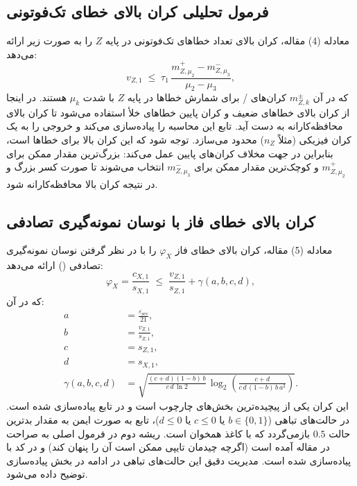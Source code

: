 \subsection{فرمول تحلیلی کران بالای خطای تک‌فوتونی}

معادله (4) مقاله، کران بالای تعداد خطاهای تک‌فوتونی در پایه $Z$ را به صورت زیر ارائه می‌دهد:
\begin{equation}
	v_{Z,1} \;\le\; \tau_1\,\frac{m_{Z,\mu_2}^{+} - m_{Z,\mu_3}^{-}}{\mu_2 - \mu_3},
\end{equation}
که در آن $m_{Z,k}^{\pm}$ کران‌های / برای شمارش خطاها در پایه $Z$ با شدت $\mu_k$ هستند. در اینجا از کران بالای خطاهای  ضعیف و کران پایین خطاهای خلأ استفاده می‌شود تا کران بالای محافظه‌کارانه به دست آید. تابع  این محاسبه را پیاده‌سازی می‌کند و خروجی را به یک کران فیزیکی (مثلاً $n_Z$) محدود می‌سازد. توجه شود که این کران بالا برای خطاها است، بنابراین در جهت مخلاف کران‌های پایین عمل می‌کند: بزرگ‌ترین مقدار ممکن برای $m_{Z,\mu_2}^{+}$ و کوچک‌ترین مقدار ممکن برای $m_{Z,\mu_3}^{-}$ انتخاب می‌شوند تا صورت کسر بزرگ و در نتیجه کران بالا محافظه‌کارانه شود.

\subsection{کران بالای خطای فاز با نوسان نمونه‌گیری تصادفی}

معادله (5) مقاله، کران بالای خطای فاز $\varphi_X$ را با در نظر گرفتن نوسان نمونه‌گیری تصادفی () ارائه می‌دهد:
\begin{equation}
	\varphi_X = \frac{c_{X,1}}{s_{X,1}} \;\le\; \frac{v_{Z,1}}{s_{Z,1}} + \gamma(a, b, c, d),
\end{equation}
که در آن:
\begin{align}
	a &= \frac{\varepsilon_{\text{sec}}}{21}, \\
	b &= \frac{v_{Z,1}}{s_{Z,1}}, \\
	c &= s_{Z,1}, \\
	d &= s_{X,1}, \\
	\gamma(a, b, c, d) &= \sqrt{\frac{(c+d)(1-b)\,b}{c\,d\,\ln 2}\,\log_2\!\left(\frac{c+d}{c\,d\,(1-b)\,b\,a^2}\right)}.
\end{align}
این کران یکی از پیچیده‌ترین بخش‌های چارچوب  است و در تابع  پیاده‌سازی شده است. در حالت‌های تباهی ($b \in \{0, 1\}$ یا $c \le 0$ یا $d \le 0$)، تابع به صورت ایمن به مقدار بدترین حالت $0.5$ بازمی‌گردد که با کاغذ همخوان است. ریشه دوم در فرمول اصلی به صراحت در مقاله آمده است (اگرچه چیدمان تایپی ممکن است آن را پنهان کند) و در کد با  پیاده‌سازی شده است. مدیریت دقیق این حالت‌های تباهی در ادامه در بخش پیاده‌سازی توضیح داده می‌شود.

